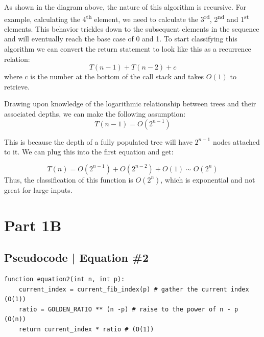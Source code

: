 \documentclass{article}
\begin{document}
\begin{flushleft}

As shown in the diagram above, the nature of this algorithm is recursive.
For example, calculating the 4\textsuperscript{th} element, we need to  calculate the 3\textsuperscript{rd}, 2\textsuperscript{nd} and 1\textsuperscript{st} elements.
This behavior trickles down to the subsequent elements in the sequence and will eventually reach the base case of 0 and 1.
To start classifying this algorithm we can convert the return statement to look like this as a recurrence relation:
$$T(n-1) + T(n-2) + c$$
where c is the number at the bottom of the call stack and takes $O(1)$ to retrieve.

Drawing upon knowledge of the logarithmic relationship between trees and their associated depths, we can make the following assumption:
$$T(n-1) = O(2^{n-1})$$

This is because the depth of a fully populated tree will have $2^{n-1}$ nodes attached to it.
We can plug this into the first equation and get:

$$T(n) = O(2^{n-1}) + O(2^{n-2}) + O(1) \sim O(2^{n})$$
Thus, the classification of this function is $O(2^{n})$, which is exponential and not great for large inputs.

\end{flushleft}

\newpage

\section{Part 1B}

\subsection{Pseudocode | Equation \#2}

\begin{verbatim}
function equation2(int n, int p):
    current_index = current_fib_index(p) # gather the current index (O(1))
    ratio = GOLDEN_RATIO ** (n -p) # raise to the power of n - p (O(n))
    return current_index * ratio # (O(1))

\end{verbatim}
\end{document}
